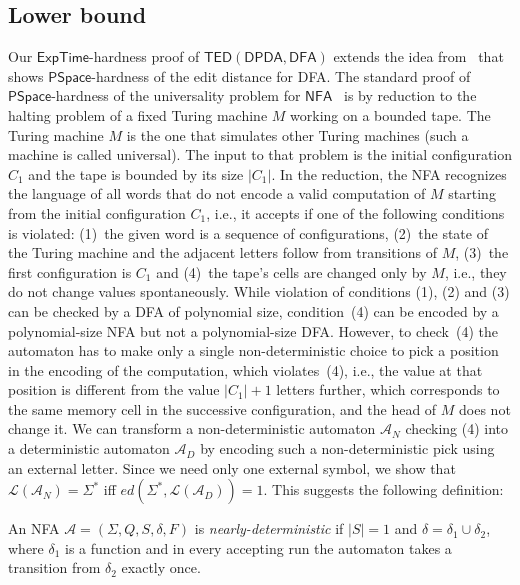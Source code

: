 \documentclass{CSML}
\newcommand{\aut}{\mathcal{A}}
\newcommand{\PSPACE}{\textsf{PSpace}}
\newcommand{\EXPTIME}{\textsf{ExpTime}}
\newcommand{\DFA}{\mathsf{DFA}}
\newcommand{\NFA}{\mathsf{NFA}}
\newcommand{\DPDA}{\mathsf{DPDA}}
\newcommand{\TED}{\mathsf{TED}}
\newcommand{\lang}{\mathcal{L}}
\newcommand{\ed}{ed}
\begin{document}
\subsection{Lower bound}
\label{sec:lowerBoundTED}

Our $\EXPTIME$-hardness proof of $\TED(\DPDA,\DFA)$ extends the idea from~\cite{riveros} that shows $\PSPACE$-hardness of the edit distance for
DFA. The standard proof of $\PSPACE$-hardness of the universality problem
for $\NFA$~\cite{HU79} is by reduction to the halting problem of a fixed Turing machine $M$ working on a bounded tape. The Turing machine $M$ is the one that simulates other Turing machines (such a machine is called universal). 
The input to that problem is the initial configuration $C_1$ and the tape is bounded by its size $|C_1|$.  
In the reduction, the NFA recognizes the language of all words that do not encode a valid computation of $M$ starting from the initial configuration $C_1$, i.e., 
it accepts if one of the following conditions is violated: 
(1)~the given word is a sequence of configurations,
(2)~the state of the Turing machine and the adjacent letters follow from transitions of $M$, 
(3)~the first configuration is $C_1$
and (4)~the tape's cells are changed only by $M$, i.e., they do not change values spontaneously.
While violation of conditions (1), (2) and (3) can be checked by a DFA of polynomial size, condition~(4)
can be encoded by a polynomial-size NFA but not a polynomial-size DFA. However, to check~(4)
the automaton has to make only a single non-deterministic choice to pick a position in the encoding of the computation, 
which violates~(4), i.e., the value at that position is different from the value $|C_1|+1$ letters further, which
corresponds to the same memory cell in the successive configuration, and the head
of $M$ does not change it. We can transform a non-deterministic automaton $\aut_N$ checking (4) into 
a deterministic automaton $\aut_D$ by encoding such a non-deterministic pick using an external letter.
Since we need only one external symbol, we show that $\lang(\aut_N) = \Sigma^*$ iff
$\ed(\Sigma^*, \lang(\aut_D)) = 1$. This suggests the following definition:

\begin{defi}
An NFA $\aut = (\Sigma, Q, S, \delta, F)$ is \emph{nearly-deterministic} if 
$|S| = 1$ and $\delta = \delta_1 \cup \delta_2$, where $\delta_1$ is a function and in
every accepting run the automaton takes a transition from $\delta_2$ exactly once.
\end{defi}
\end{document}
